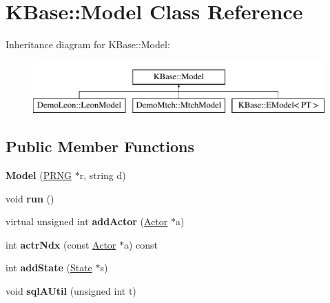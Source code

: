 \hypertarget{class_k_base_1_1_model}{\section{K\-Base\-:\-:Model Class Reference}
\label{class_k_base_1_1_model}
}
Inheritance diagram for K\-Base\-:\-:Model\-:\begin{figure}[H]
\begin{center}
\leavevmode
\includegraphics[height=2.000000cm]{class_k_base_1_1_model}
\end{center}
\end{figure}
\subsection*{Public Member Functions}
\begin{DoxyCompactItemize}
\item 
\hypertarget{class_k_base_1_1_model_a721ae81e6022dfe3f9850d5acbdd64ac}{{\bfseries Model} (\hyperlink{class_k_base_1_1_p_r_n_g}{P\-R\-N\-G} $\ast$r, string d)}\label{class_k_base_1_1_model_a721ae81e6022dfe3f9850d5acbdd64ac}

\item 
\hypertarget{class_k_base_1_1_model_a92e31c17c2d2d25ecbb5e97d4b2dc2db}{void {\bfseries run} ()}\label{class_k_base_1_1_model_a92e31c17c2d2d25ecbb5e97d4b2dc2db}

\item 
\hypertarget{class_k_base_1_1_model_ac33c6195259a8ec6ad2e048c217df06c}{virtual unsigned int {\bfseries add\-Actor} (\hyperlink{class_k_base_1_1_actor}{Actor} $\ast$a)}\label{class_k_base_1_1_model_ac33c6195259a8ec6ad2e048c217df06c}

\item 
\hypertarget{class_k_base_1_1_model_a6b642668bf98d62805388c00132834fd}{int {\bfseries actr\-Ndx} (const \hyperlink{class_k_base_1_1_actor}{Actor} $\ast$a) const }\label{class_k_base_1_1_model_a6b642668bf98d62805388c00132834fd}

\item 
\hypertarget{class_k_base_1_1_model_a8743cd5a9b81d98eccada6c75890f0b5}{int {\bfseries add\-State} (\hyperlink{class_k_base_1_1_state}{State} $\ast$s)}\label{class_k_base_1_1_model_a8743cd5a9b81d98eccada6c75890f0b5}

\item 
\hypertarget{class_k_base_1_1_model_a01c7a648c69fbc0a99fff05b678417f9}{void {\bfseries sql\-A\-Util} (unsigned int t)}\label{class_k_base_1_1_model_a01c7a648c69fbc0a99fff05b678417f9}

\end{DoxyCompactItemize}
